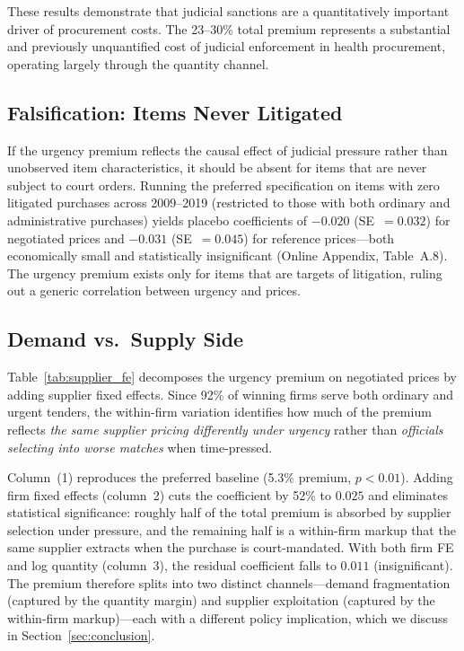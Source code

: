 These results demonstrate that judicial sanctions are a quantitatively important driver of procurement costs. The 23--30\% total premium represents a substantial and previously unquantified cost of judicial enforcement in health procurement, operating largely through the quantity channel.

\subsection{Falsification: Items Never Litigated}
\label{sec:placebo}

If the urgency premium reflects the causal effect of judicial pressure
rather than unobserved item characteristics, it should be absent for
items that are never subject to court orders. Running the preferred
specification on items with zero litigated purchases across 2009--2019
(restricted to those with both ordinary and administrative purchases)
yields placebo coefficients of $-0.020$ (SE~$= 0.032$) for negotiated
prices and $-0.031$ (SE~$= 0.045$) for reference prices---both
economically small and statistically insignificant (Online Appendix,
Table~A.8). The urgency premium exists only for items
that are targets of litigation, ruling out a generic correlation
between urgency and prices.

\subsection{Demand vs.\ Supply Side}
\label{sec:supplier_fe}

Table~\ref{tab:supplier_fe} decomposes the urgency premium on negotiated
prices by adding supplier fixed effects. Since 92\% of winning firms
serve both ordinary and urgent tenders, the within-firm variation
identifies how much of the premium reflects \emph{the same supplier
pricing differently under urgency} rather than \emph{officials selecting
into worse matches} when time-pressed.



Column~(1) reproduces the preferred baseline (5.3\% premium, $p < 0.01$).
Adding firm fixed effects (column~2) cuts the coefficient by 52\% to
$0.025$ and eliminates statistical significance: roughly half of the total
premium is absorbed by supplier selection under pressure, and the
remaining half is a within-firm markup that the same supplier extracts
when the purchase is court-mandated. With both firm FE and log quantity
(column~3), the residual coefficient falls to $0.011$ (insignificant).
The premium therefore splits into two distinct channels---demand
fragmentation (captured by the quantity margin) and supplier exploitation
(captured by the within-firm markup)---each with a different policy
implication, which we discuss in Section~\ref{sec:conclusion}.

